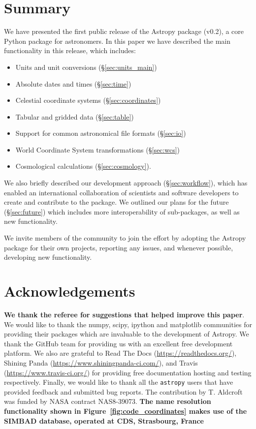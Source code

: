 \documentclass[traditabstract]{aa}
\newcommand{\astropy}{\texttt{astropy}\xspace}
\begin{document}
\section{Summary}

\label{sec:summary}


We have presented the first public release of the Astropy package (v0.2), a
core Python package for astronomers. In this paper we have described the main
functionality in this release, which includes:

\begin{itemize}
\item Units and unit conversions (\S\ref{sec:units_main})
\item Absolute dates and times (\S\ref{sec:time})
\item Celestial coordinate systems (\S\ref{sec:coordinates})
\item Tabular and gridded data (\S\ref{sec:table})
\item Support for common astronomical file formats (\S\ref{sec:io})
\item World Coordinate System transformations (\S\ref{sec:wcs})
\item Cosmological calculations (\S\ref{sec:cosmology}).
\end{itemize}

We also briefly described our development approach (\S\ref{sec:workflow}),
which has enabled an international collaboration of scientists and software
developers to create and contribute to the package. We outlined our plans for
the future (\S\ref{sec:future}) which includes more interoperability of
sub-packages, as well as new functionality.

We invite members of the community to join the effort by adopting the Astropy package for
their own projects, reporting any issues, and whenever possible, developing new
functionality.


\section*{Acknowledgements}

\label{sec:acknowledgements}

\textbf{We thank the referee for suggestions that helped improve this paper}.
We would like to thank the \gls{numpy}, \gls{scipy}, \gls{ipython} and
\gls{matplotlib} communities for providing their packages which are invaluable
to the development of Astropy. We thank the GitHub team for providing us with
an excellent free development platform. We also are grateful to Read The Docs
(\url{https://readthedocs.org/}), Shining Panda
(\url{https://www.shiningpanda-ci.com/}), and Travis
(\url{https://www.travis-ci.org/}) for providing free documentation
hosting and testing respectively. Finally, we would like to thank all the
\astropy users that have provided feedback and submitted bug reports.
The contribution by T. Aldcroft was funded by NASA contract NAS8-39073.
\textbf{The name resolution functionality shown in
Figure~\ref{fig:code_coordinates} makes use of the SIMBAD database, operated
at CDS, Strasbourg, France}



\end{document}
